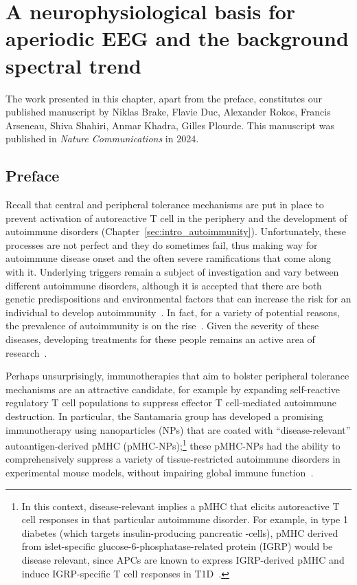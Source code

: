 \chapter{A neurophysiological basis for aperiodic EEG and the background spectral trend}
\label{sec:Tr1}

The work presented in this chapter, apart from the preface, constitutes our published manuscript  by Niklas Brake, Flavie Duc, Alexander Rokos, Francis Arseneau, Shiva Shahiri, Anmar Khadra, Gilles Plourde. This manuscript was published in \textit{Nature Communications} in 2024.

\section*{Preface}

Recall that central and peripheral tolerance mechanisms are put in place to prevent activation of autoreactive T cell in the periphery and the development of autoimmune disorders (Chapter~\ref{sec:intro_autoimmunity}). Unfortunately, these processes are not perfect and they do sometimes fail, thus making way for autoimmune disease onset and the often severe ramifications that come along with it. Underlying triggers remain a subject of investigation and vary between different autoimmune disorders, although it is accepted that there are both genetic predispositions and environmental factors that can increase the risk for an individual to develop autoimmunity~\cite{thorsby2005hla}. In fact, for a variety of potential reasons, the prevalence of autoimmunity is on the rise~\cite{miller2023increasing}. Given the severity of these diseases, developing treatments for these people remains an active area of research~\cite{jung2022targeted}.

Perhaps unsurprisingly, immunotherapies that aim to bolster peripheral tolerance mechanisms are an attractive candidate, for example by expanding self-reactive regulatory T cell populations to suppress effector T cell-mediated autoimmune destruction. In particular, the Santamaria group has developed a promising immunotherapy using nanoparticles (NPs) that are coated with ``disease-relevant'' autoantigen-derived pMHC (pMHC-NPs);\footnote{In this context, disease-relevant implies a pMHC that elicits autoreactive T cell responses in that particular autoimmune disorder. For example, in type 1 diabetes (which targets insulin-producing pancreatic \textbeta{}-cells), pMHC derived from islet-specific glucose-6-phosphatase-related protein (IGRP) would be disease relevant, since APCs are known to express IGRP-derived pMHC and induce IGRP-specific T cell responses in T1D~\cite{mitchell2022self}.} these pMHC-NPs had the ability to comprehensively suppress a variety of tissue-restricted autoimmune disorders in experimental mouse models, without impairing global immune function~\cite{clemente2016expanding}.

